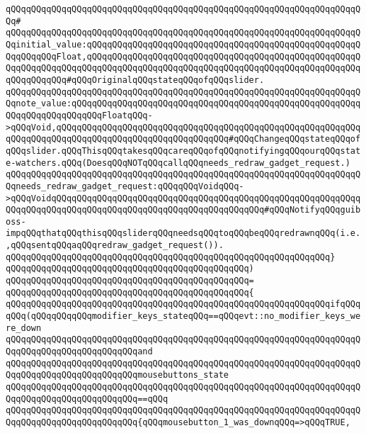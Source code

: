 \verb|qQQqqQQqqQQqqQQqqQQqqQQqqQQqqQQqqQQqqQQqqQQqqQQqqQQqqQQqqQQqqQQqqQQqqQQq#|\newline
\verb|qQQqqQQqqQQqqQQqqQQqqQQqqQQqqQQqqQQqqQQqqQQqqQQqqQQqqQQqqQQqqQQqqQQqqQQqinitial_value:qQQqqQQqqQQqqQQqqQQqqQQqqQQqqQQqqQQqqQQqqQQqqQQqqQQqqQQqqQQqqQQqFloat,qQQqqQQqqQQqqQQqqQQqqQQqqQQqqQQqqQQqqQQqqQQqqQQqqQQqqQQqqQQqqQQqqQQqqQQqqQQqqQQqqQQqqQQqqQQqqQQqqQQqqQQqqQQqqQQqqQQqqQQqqQQqqQQqqQQqqQQq#qQQqOriginalqQQqstateqQQqofqQQqslider.|\newline
\verb|qQQqqQQqqQQqqQQqqQQqqQQqqQQqqQQqqQQqqQQqqQQqqQQqqQQqqQQqqQQqqQQqqQQqqQQqnote_value:qQQqqQQqqQQqqQQqqQQqqQQqqQQqqQQqqQQqqQQqqQQqqQQqqQQqqQQqqQQqqQQqqQQqqQQqqQQqFloatqQQq->qQQqVoid,qQQqqQQqqQQqqQQqqQQqqQQqqQQqqQQqqQQqqQQqqQQqqQQqqQQqqQQqqQQqqQQqqQQqqQQqqQQqqQQqqQQqqQQqqQQqqQQqqQQqqQQq#qQQqChangeqQQqstateqQQqofqQQqslider.qQQqThisqQQqtakesqQQqcareqQQqofqQQqnotifyingqQQqourqQQqstate-watchers.qQQq(DoesqQQqNOTqQQqcallqQQqneeds_redraw_gadget_request.)|\newline
\verb|qQQqqQQqqQQqqQQqqQQqqQQqqQQqqQQqqQQqqQQqqQQqqQQqqQQqqQQqqQQqqQQqqQQqqQQqneeds_redraw_gadget_request:qQQqqQQqVoidqQQq->qQQqVoidqQQqqQQqqQQqqQQqqQQqqQQqqQQqqQQqqQQqqQQqqQQqqQQqqQQqqQQqqQQqqQQqqQQqqQQqqQQqqQQqqQQqqQQqqQQqqQQqqQQqqQQqqQQqqQQq#qQQqNotifyqQQqguiboss-impqQQqthatqQQqthisqQQqsliderqQQqneedsqQQqtoqQQqbeqQQqredrawnqQQq(i.e.,qQQqsentqQQqaqQQqredraw_gadget_request()).|\newline
\verb|qQQqqQQqqQQqqQQqqQQqqQQqqQQqqQQqqQQqqQQqqQQqqQQqqQQqqQQqqQQqqQQq}|\newline
\verb|qQQqqQQqqQQqqQQqqQQqqQQqqQQqqQQqqQQqqQQqqQQqqQQq)|\newline
\verb|qQQqqQQqqQQqqQQqqQQqqQQqqQQqqQQqqQQqqQQqqQQqqQQq=|\newline
\verb|qQQqqQQqqQQqqQQqqQQqqQQqqQQqqQQqqQQqqQQqqQQqqQQq{|\newline
\verb|qQQqqQQqqQQqqQQqqQQqqQQqqQQqqQQqqQQqqQQqqQQqqQQqqQQqqQQqqQQqqQQqifqQQqqQQq(qQQqqQQqqQQqmodifier_keys_stateqQQq==qQQqevt::no_modifier_keys_were_down|\newline
\verb|qQQqqQQqqQQqqQQqqQQqqQQqqQQqqQQqqQQqqQQqqQQqqQQqqQQqqQQqqQQqqQQqqQQqqQQqqQQqqQQqqQQqqQQqqQQqqQQqand|\newline
\verb|qQQqqQQqqQQqqQQqqQQqqQQqqQQqqQQqqQQqqQQqqQQqqQQqqQQqqQQqqQQqqQQqqQQqqQQqqQQqqQQqqQQqqQQqqQQqqQQqmousebuttons_state|\newline
\verb|qQQqqQQqqQQqqQQqqQQqqQQqqQQqqQQqqQQqqQQqqQQqqQQqqQQqqQQqqQQqqQQqqQQqqQQqqQQqqQQqqQQqqQQqqQQqqQQq==qQQq|\newline
\verb|qQQqqQQqqQQqqQQqqQQqqQQqqQQqqQQqqQQqqQQqqQQqqQQqqQQqqQQqqQQqqQQqqQQqqQQqqQQqqQQqqQQqqQQqqQQqqQQq{qQQqmousebutton_1_was_downqQQq=>qQQqTRUE,|\newline

